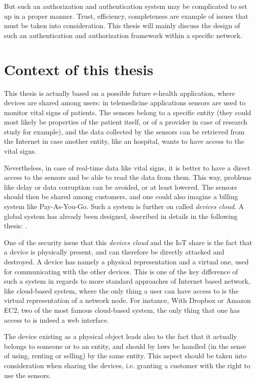 But such an authorization and authentication system may be complicated to set up in a proper manner. Trust, efficiency, completeness are example of issues that must be taken into consideration. This thesis will mainly discuss the design of such an authentication and authorization framework within a specific network. 

\section{Context of this thesis}

This thesis is actually based on a possible future e-health application, where devices are shared among users: in telemedicine applications sensors are used to monitor vital signs of patients. The sensors belong to a specific entity (they could most likely be properties of the patient itself, or of a provider in case of research study for example), and the data collected by the sensors can be retrieved from the Internet in case another entity, like an hospital, wants to have access to the vital signs. 

Nevertheless, in case of real-time data like vital signs, it is better to have a direct access to the sensors and be able to read the data from them. This way, problems like delay or data corruption can be avoided, or at least lowered. The sensors should then be shared among customers, and one could also imagine a billing system like Pay-As-You-Go. Such a system is further on called \emph{devices cloud}. A global system has already been designed, described in details in the following thesis:  \cite{reference_thesis}.

One of the security issue that this \emph{devices cloud} and the IoT share is the fact that a device is physically present, and can therefore be directly attacked and destroyed. A device has namely a physical representation and a virtual one, used for communicating with the other devices. This is one of the key difference of such a system in regards to more standard approaches of Internet based network, like cloud-based system, where the only thing a user can have access to is the virtual representation of a network node. For instance, With Dropbox or Amazon EC2, two of the most famous cloud-based system, the only thing that one has access to is indeed a web interface.

The device existing as a physical object leads also to the fact that it actually belongs to someone or to an entity, and should by laws be handled (in the sense of using, renting or selling) by the same entity. This aspect should be taken into consideration when sharing the devices, i.e. granting a customer with the right to use the sensors.


